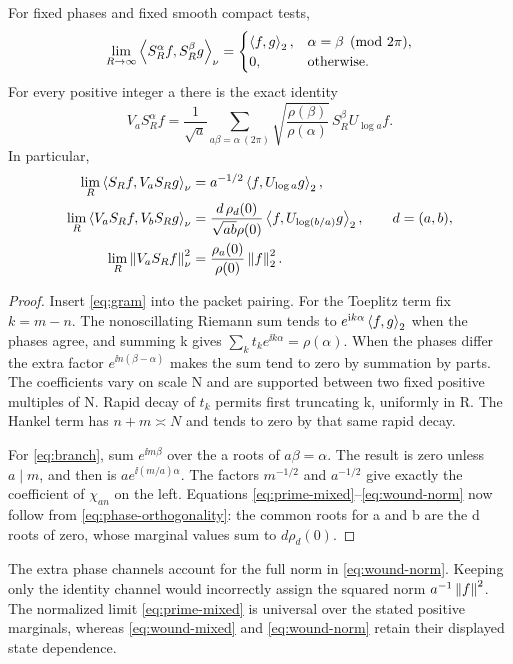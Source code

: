 \begin{theorem}\label{thm:packets}
For fixed phases and fixed smooth compact tests,
\begin{equation}\label{eq:phase-orthogonality}
\lim_{R\to\infty}\left\langle S_R^\alpha f,S_R^\beta g\right\rangle_\nu
=\begin{cases}\left\langle f,g\right\rangle_2,&\alpha=\beta\pmod{2\pi},\\0,&\text{otherwise}.
\end{cases}
\end{equation}
For every positive integer a there is the exact identity
\begin{equation}\label{eq:branch}
V_aS_R^\alpha f=\frac1{\sqrt a}
\sum_{a\beta=\alpha\ (2\pi)}
\sqrt{\frac{\rho(\beta)}{\rho(\alpha)}}\,
S_R^\beta U_{\log a}f .
\end{equation}
In particular,
\begin{align}
\lim_R\left\langle S_Rf,V_aS_Rg\right\rangle_\nu
 &=a^{-1/2}\left\langle f,U_{\log a}g\right\rangle_2,\label{eq:prime-mixed}\\
\lim_R\left\langle V_aS_Rf,V_bS_Rg\right\rangle_\nu
 &=\frac{d\,\rho_d(0)}{\sqrt{ab}\rho(0)}
       \left\langle f,U_{\log(b/a)}g\right\rangle_2,\qquad d=(a,b),\label{eq:wound-mixed}\\
\lim_R\left\lVert V_aS_Rf\right\rVert_\nu^2
 &=\frac{\rho_a(0)}{\rho(0)}\left\lVert f\right\rVert_2^2.\label{eq:wound-norm}
\end{align}
\end{theorem}
\begin{proof}
Insert \eqref{eq:gram} into the packet pairing. For the Toeplitz term
fix $k=m-n$. The nonoscillating Riemann sum tends to
$e^{\mathrm i k\alpha}\left\langle f,g\right\rangle_2$ when the phases agree, and summing k
gives $\sum_k t_ke^{\ii k\alpha}=\rho(\alpha)$.
When the phases differ the extra factor $e^{\ii n(\beta-\alpha)}$
makes the sum tend to zero by summation by parts. The coefficients
vary on scale N and are supported between two fixed positive
multiples of N. Rapid decay of $t_k$ permits first truncating k,
uniformly in R. The Hankel term has $n+m\asymp N$ and tends to zero
by that same rapid decay.

For \eqref{eq:branch}, sum $e^{\ii m\beta}$ over the a roots of
$a\beta=\alpha$. The result is zero unless $a\mid m$, and then is
$ae^{\ii(m/a)\alpha}$. The factors $m^{-1/2}$ and $a^{-1/2}$ give
exactly the coefficient of $\chi_{an}$ on the left. Equations
\eqref{eq:prime-mixed}--\eqref{eq:wound-norm} now follow from
\eqref{eq:phase-orthogonality}: the common roots for a and b are
the d roots of zero, whose marginal values sum to $d\rho_d(0)$.
\end{proof}
The extra phase channels account for the full norm in
\eqref{eq:wound-norm}. Keeping only the identity channel would
incorrectly assign the squared norm $a^{-1}\left\lVert f\right\rVert^2$.
The normalized limit \eqref{eq:prime-mixed} is universal over the
stated positive marginals, whereas \eqref{eq:wound-mixed} and
\eqref{eq:wound-norm} retain their displayed state dependence.

